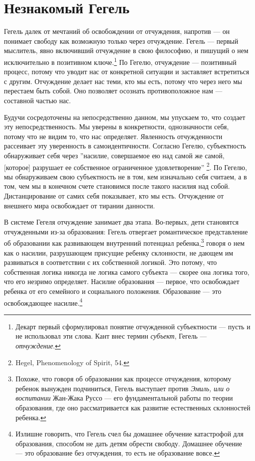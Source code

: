 \documentclass[12pt]{book}
\begin{document}
\section{Незнакомый Гегель}

Гегель далек от мечтаний об освобождении от отчуждения, напротив --- он понимает свободу как возможную только через отчуждение. Гегель --- первый мыслитель, явно включивший отчуждение в свою философию, и пишущий о нем исключительно в позитивном ключе.\footnote{Декарт первый сформулировал понятие отчужденной субъектности --- пусть и не использовал эти слова. Кант внес термин \textit{субъект}, Гегель --- \textit{отчуждение}.} По Гегелю, отчуждение --- позитивный процесс, потому что уводит нас от конкретной ситуации и заставляет встретиться с другим. Отчуждение делает нас теми, кто мы есть, потому что через него мы перестаем быть собой. Оно позволяет осознать противоположное нам --- составной частью нас.

Будучи сосредоточены на непосредственно данном, мы упускаем то, что создает эту непосредственность. Мы уверены в конкретности, однозначности себя, потому что не видим то, что нас определяет. Явленность отчужденности рассеивает эту уверенность в самоидентичности. Согласно Гегелю, субъектность обнаруживает себя через ''насилие, совершаемое ею над самой же самой, [которое] разрушает ее собственное ограниченное удовлетворение'' \footnote{Hegel, Phenomenology of Spirit, 54.}. По Гегелю, мы обнаруживаем свою субъектность не в том, кем изначально себя считаем, а в том, чем мы в конечном счете становимся после такого насилия над собой. Дистанцирование от самих себя показывает, кто мы есть. Отчуждение от внешнего мира освобождает от тирании данности.

В системе Гегеля отчуждение занимает два этапа. Во-первых, дети становятся отчужденными из-за образования: Гегель отвергает романтическое представление об образовании как развивающем внутренний потенциал ребенка,\footnote{Похоже, что говоря об образовании как процессе отчуждения, которому ребенок вынужден подчиниться, Гегель выступает против \textit{Эмиль, или о воспитании} Жан-Жака Руссо --- его фундаментальной работы по теории образования, где оно рассматривается как развитие естественных склонностей ребенка.} говоря о нем как о насилии, разрушающем присущие ребенку склонности, не дающем им развиваться в соответствии с их собственной логикой. Это потому, что собственная логика никогда не логика самого субъекта --- скорее она логика того, что его незримо определяет. Насилие образования --- первое, что освобождает ребенка от его семейного и социального положения. Образование --- это освобождающее насилие.\footnote{Излишне говорить, что Гегель счел бы домашнее обучение катастрофой для образования, способом не дать детям обрести свободу. Домашнее обучение --- это образование без отчуждения, то есть не образование вовсе.}
\end{document}
